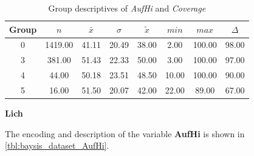 \begin{table}[ht]
	\small
	\centering
    \begin{tabular}{c|c|c|c|c|c|c|c}
        \toprule
        Group & $n$ & $\bar{x}$ & $\sigma$ & $\tilde{x}$ & $min$ & $max$ & $\Delta$ \\ 
        \midrule
        0 & 1419.00 & 41.11 & 20.49 & 38.00 & 2.00 & 100.00 & 98.00 \\ 
        3 & 381.00 & 51.43 & 22.33 & 50.00 & 3.00 & 100.00 & 97.00 \\ 
        4 & 44.00 & 50.18 & 23.51 & 48.50 & 10.00 & 100.00 & 90.00 \\ 
        5 & 16.00 & 51.50 & 20.07 & 42.00 & 22.00 & 89.00 & 67.00 \\ 
        \bottomrule
      \end{tabular}
	\caption{Group descriptives of \textit{AufHi} and \textit{Coverage}}
	\label{tbl:descriptives_baysis_matched_AufHi_Cov}
\end{table}

\Large
\centerline{\textbf{Lich}}
\normalsize
The encoding and description of the variable \textbf{AufHi} is shown in \autoref{tbl:baysis_dataset_AufHi}.

